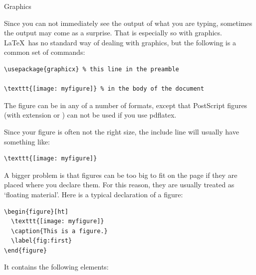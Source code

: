  {Graphics}

Since you can not immediately see the output of what you are typing,
sometimes the output may come as a surprise. That is especially so
with graphics. \LaTeX\ has no standard way of dealing with graphics,
but the following is a common set of commands:
\begin{verbatim}
\usepackage{graphicx} % this line in the preamble

\texttt{[image: myfigure]} % in the body of the document
\end{verbatim}
The figure can be in any of a number of formats, except that
PostScript figures (with extension  or )
can not be used if you use pdflatex.

Since your figure is often not the right size, the include line will
usually have something like:
\begin{verbatim}
\texttt{[image: myfigure]}  
\end{verbatim}
A bigger problem is that figures can be too big to fit on the page if
they are placed where you declare them. For this reason, they are
usually treated as `floating material'. Here is a typical  declaration
of a figure:
\begin{verbatim}
\begin{figure}[ht]
  \texttt{[image: myfigure]}
  \caption{This is a figure.}
  \label{fig:first}
\end{figure}
\end{verbatim}
It contains the following elements:
